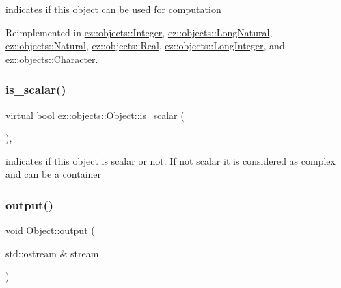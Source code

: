 indicates if this object can be used for computation 

Reimplemented in \hyperlink{classez_1_1objects_1_1Integer_a8b35ec8937520b2227650aa489427bcd}{ez\+::objects\+::\+Integer}, \hyperlink{classez_1_1objects_1_1LongNatural_a4cd663dc6f1eff09b83d19d76dd503cb}{ez\+::objects\+::\+Long\+Natural}, \hyperlink{classez_1_1objects_1_1Natural_a0cb91a0c6b56b101bdf60e08df4d83f2}{ez\+::objects\+::\+Natural}, \hyperlink{classez_1_1objects_1_1Real_a3b215250b4df60c975bc378792b115b4}{ez\+::objects\+::\+Real}, \hyperlink{classez_1_1objects_1_1LongInteger_ad9241d39b14d6cff1173c692ac37c8fc}{ez\+::objects\+::\+Long\+Integer}, and \hyperlink{classez_1_1objects_1_1Character_ae94793b98d9c5a173ba73e110420f187}{ez\+::objects\+::\+Character}.

\mbox{\label{classez_1_1objects_1_1Object_a08d51e793285a46e20fb578056052a48}} 
\subsubsection{\texorpdfstring{is\+\_\+scalar()}{is\_scalar()}}
{\footnotesize\ttfamily virtual bool ez\+::objects\+::\+Object\+::is\+\_\+scalar (\begin{DoxyParamCaption}{ }\end{DoxyParamCaption})\hspace{0.3cm}{\ttfamily [inline]}, {\ttfamily [virtual]}}

indicates if this object is scalar or not. If not scalar it is considered as complex and can be a container \mbox{\label{classez_1_1objects_1_1Object_a0fdfe18e6c35d6b0d7e7a01265aded15}} 
\subsubsection{\texorpdfstring{output()}{output()}}
{\footnotesize\ttfamily void Object\+::output (\begin{DoxyParamCaption}\item[{std\+::ostream \&}]{stream }\end{DoxyParamCaption})\hspace{0.3cm}{\ttfamily [virtual]}}

